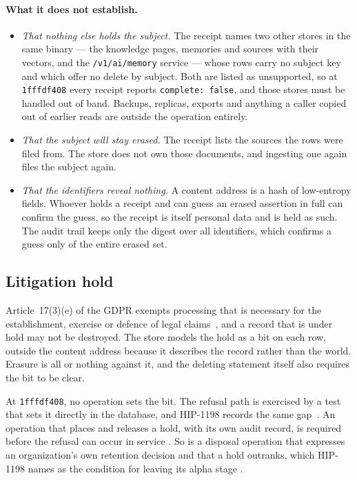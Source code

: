 \paragraph{What it does not establish.}
\begin{itemize}[leftmargin=*,itemsep=2pt]
\item \emph{That nothing else holds the subject.} The receipt names two other
  stores in the same binary --- the knowledge pages, memories and sources with
  their vectors, and the \texttt{/v1/ai/memory} service --- whose rows carry no
  subject key and which offer no delete by subject. Both are listed as
  unsupported, so at \texttt{1fffdf408} every receipt reports
  \texttt{complete: false}, and those stores must be handled out of band. Backups,
  replicas, exports and anything a caller copied out of earlier reads are outside
  the operation entirely.
\item \emph{That the subject will stay erased.} The receipt lists the sources the
  rows were filed from. The store does not own those documents, and ingesting one
  again files the subject again.
\item \emph{That the identifiers reveal nothing.} A content address is a hash of
  low-entropy fields. Whoever holds a receipt and can guess an erased assertion
  in full can confirm the guess, so the receipt is itself personal data and is
  held as such. The audit trail keeps only the digest over all identifiers,
  which confirms a guess only of the entire erased set.
\end{itemize}

\subsection{Litigation hold}

Article~17(3)(e) of the GDPR exempts processing that is necessary for the
establishment, exercise or defence of legal claims~\cite{gdpr}, and a record
that is under hold may not be destroyed. The store models the hold as a bit on
each row, outside the content address because it describes the record rather
than the world. Erasure is all or nothing against it, and the deleting statement
itself also requires the bit to be clear.

At \texttt{1fffdf408}, no operation sets the bit. The refusal path is exercised by
a test that sets it directly in the database, and HIP-1198 records the same
gap~\cite{hip1198}. An operation that places and releases a hold, with its own
audit record, is required before the refusal can occur in service
\proposed{}. So is a disposal operation that expresses an organization's own
retention decision and that a hold outranks, which HIP-1198 names as the
condition for leaving its alpha stage \proposed{}.
